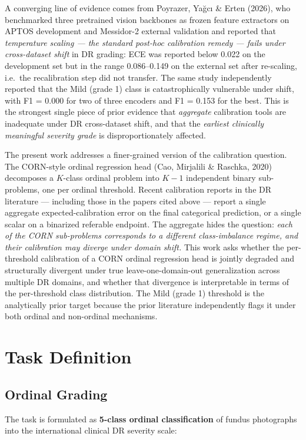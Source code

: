 \documentclass[11pt]{article}
\begin{document}
A converging line of evidence comes from Poyrazer, Yağcı \& Erten (2026), who benchmarked three pretrained vision backbones as frozen feature extractors on APTOS development and Messidor-2 external validation and reported that \emph{temperature scaling --- the standard post-hoc calibration remedy --- fails under cross-dataset shift} in DR grading: ECE was reported below 0.022 on the development set but in the range 0.086--0.149 on the external set after re-scaling, i.e.\ the recalibration step did not transfer. The same study independently reported that the Mild (grade 1) class is catastrophically vulnerable under shift, with F1 = 0.000 for two of three encoders and F1 = 0.153 for the best. This is the strongest single piece of prior evidence that \emph{aggregate} calibration tools are inadequate under DR cross-dataset shift, and that the \emph{earliest clinically meaningful severity grade} is disproportionately affected.

The present work addresses a finer-grained version of the calibration question. The CORN-style ordinal regression head (Cao, Mirjalili \& Raschka, 2020) decomposes a $K$-class ordinal problem into $K-1$ independent binary sub-problems, one per ordinal threshold. Recent calibration reports in the DR literature --- including those in the papers cited above --- report a single aggregate expected-calibration error on the final categorical prediction, or a single scalar on a binarized referable endpoint. The aggregate hides the question: \emph{each of the CORN sub-problems corresponds to a different class-imbalance regime, and their calibration may diverge under domain shift.} This work asks whether the per-threshold calibration of a CORN ordinal regression head is jointly degraded and structurally divergent under true leave-one-domain-out generalization across multiple DR domains, and whether that divergence is interpretable in terms of the per-threshold class distribution. The Mild (grade 1) threshold is the analytically prior target because the prior literature independently flags it under both ordinal and non-ordinal mechanisms.

\section{Task Definition}

\subsection{Ordinal Grading}
The task is formulated as \textbf{5-class ordinal classification} of fundus photographs into the international clinical DR severity scale:
\end{document}

